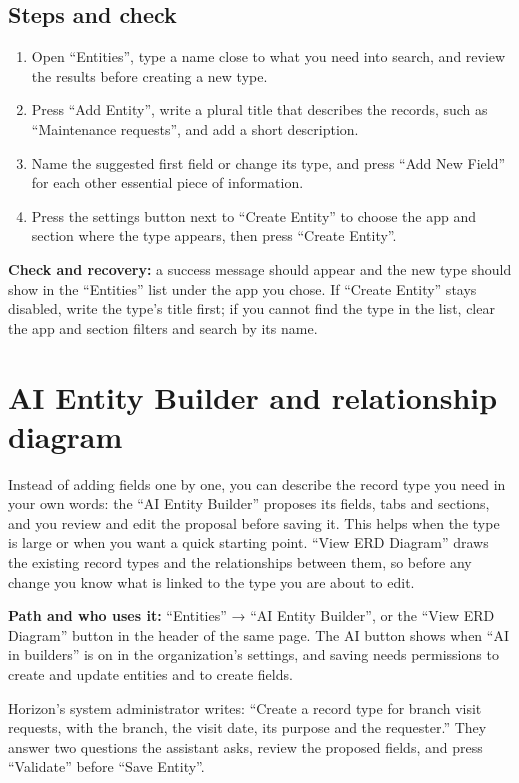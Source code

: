 \subsection{Steps and check}
\begin{enumerate}
\item Open “Entities”, type a name close to what you need into search, and review the results before creating a new type.
\item Press “Add Entity”, write a plural title that describes the records, such as “Maintenance requests”, and add a short description.
\item Name the suggested first field or change its type, and press “Add New Field” for each other essential piece of information.
\item Press the settings button next to “Create Entity” to choose the app and section where the type appears, then press “Create Entity”.
\end{enumerate}

\textbf{Check and recovery:} a success message should appear and the new type should show in the “Entities” list under the app you chose. If “Create Entity” stays disabled, write the type's title first; if you cannot find the type in the list, clear the app and section filters and search by its name.

\clearpage
\section{AI Entity Builder and relationship diagram}
\label{sec:builder-feature-ai-builder}

Instead of adding fields one by one, you can describe the record type you need in your own words: the “AI Entity Builder” proposes its fields, tabs and sections, and you review and edit the proposal before saving it. This helps when the type is large or when you want a quick starting point. “View ERD Diagram” draws the existing record types and the relationships between them, so before any change you know what is linked to the type you are about to edit.

\textbf{Path and who uses it:} “Entities” → “AI Entity Builder”, or the “View ERD Diagram” button in the header of the same page. The AI button shows when “AI in builders” is on in the organization's settings, and saving needs permissions to create and update entities and to create fields.

\begin{rcnote}
Horizon's system administrator writes: “Create a record type for branch visit requests, with the branch, the visit date, its purpose and the requester.” They answer two questions the assistant asks, review the proposed fields, and press “Validate” before “Save Entity”.
\end{rcnote}

